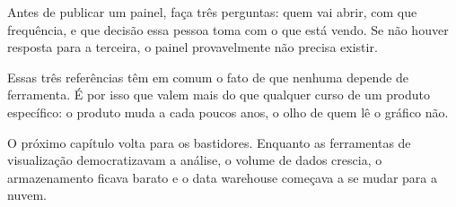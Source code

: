 \begin{dica}
Antes de publicar um painel, faça três perguntas: quem vai abrir, com que frequência, e
que decisão essa pessoa toma com o que está vendo. Se não houver resposta para a terceira,
o painel provavelmente não precisa existir.
\end{dica}

Essas três referências têm em comum o fato de que nenhuma depende de ferramenta. É
por isso que valem mais do que qualquer curso de um produto específico: o produto muda a
cada poucos anos, o olho de quem lê o gráfico não.

O próximo capítulo volta para os bastidores. Enquanto as ferramentas de visualização
democratizavam a análise, o volume de dados crescia, o armazenamento ficava barato e o
data warehouse começava a se mudar para a nuvem.

\begin{leituras}
\end{leituras}
